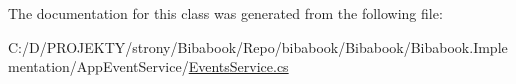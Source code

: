 The documentation for this class was generated from the following file\+:\begin{DoxyCompactItemize}
\item 
C\+:/\+D/\+P\+R\+O\+J\+E\+K\+T\+Y/strony/\+Bibabook/\+Repo/bibabook/\+Bibabook/\+Bibabook.\+Implementation/\+App\+Event\+Service/\hyperlink{_events_service_8cs}{Events\+Service.\+cs}\end{DoxyCompactItemize}
